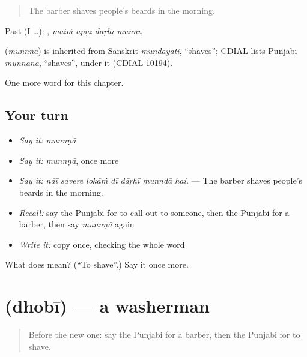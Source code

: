 \begin{quote}
The barber shaves people's beards in the morning.
\end{quote}

Past (I …):    , \emph{maiṁ āpṇī dāṛhī munnī}.

\begin{cousinweb}
\textbf{} (\emph{munnṇā}) is inherited from Sanskrit \emph{muṇḍayati}, \textquotedblleft{}shaves\textquotedblright{}; CDIAL lists Punjabi \emph{munnanā}, \textquotedblleft{}shaves\textquotedblright{}, under it (CDIAL 10194).
\end{cousinweb}

\begin{grammarlens}[title={What you've built}]
One more word for this chapter.
\end{grammarlens}

\subsection*{Your turn}
\begin{itemize}
\raggedright
  \item \emph{Say it:} \emph{munnṇā}
  \item \emph{Say it:} \emph{munnṇā}, once more
  \item \emph{Say it:} \emph{nāī savere lokāṁ dī dāṛhī munndā hai.} — The barber shaves people's beards in the morning.
  \item \emph{Recall:} say the Punjabi for to call out to someone, then the Punjabi for a barber, then say \emph{munnṇā} again
  \item \emph{Write it:} copy \textbf{} once, checking the whole word
\end{itemize}

\begin{tcolorbox}[breakable,colback=teal!4,colframe=teal!35!black,title={Before you move on}]
What does  mean? (\textquotedblleft{}To shave\textquotedblright{}.) Say it once more.
\end{tcolorbox}
\section[\texorpdfstring{\pa{ਧੋਬੀ} (dhobī)}{ਧੋਬੀ (dhobī)}]{ (dhobī) — a washerman}

\label{lesson:PA-C333-dhobi}



\begin{quote}
Before the new one: say the Punjabi for a barber, then the Punjabi for to shave.
\end{quote}

